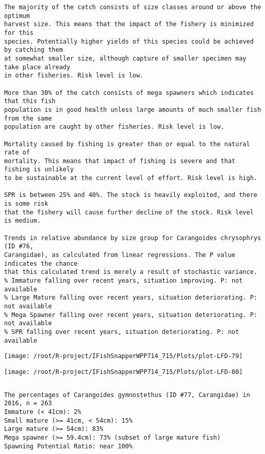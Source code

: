 \documentclass{report}\usepackage[]{graphicx}\usepackage[]{color}
\makeatletter
\def\maxwidth{ %
  \ifdim\Gin@nat@width>\linewidth
    \linewidth
  \else
    \Gin@nat@width
  \fi
}
\newenvironment{kframe}{%
 \def\at@end@of@kframe{}%
 \ifinner\ifhmode%
  \def\at@end@of@kframe{\end{minipage}}%
  \begin{minipage}{\columnwidth}%
 \fi\fi%
 \def\FrameCommand##1{\hskip\@totalleftmargin \hskip-\fboxsep
 \colorbox{shadecolor}{##1}\hskip-\fboxsep
     \hskip-\linewidth \hskip-\@totalleftmargin \hskip\columnwidth}%
 \MakeFramed {\advance\hsize-\width
   \@totalleftmargin\z@ \linewidth\hsize
   \@setminipage}}%
 {\par\unskip\endMakeFramed%
 \at@end@of@kframe}
\newenvironment{knitrout}{}{} %
\makeatother
\begin{document}
\begin{knitrout}
\begin{kframe}
\begin{verbatim}
The majority of the catch consists of size classes around or above the optimum
harvest size. This means that the impact of the fishery is minimized for this
species. Potentially higher yields of this species could be achieved by catching them
at somewhat smaller size, although capture of smaller specimen may take place already
in other fisheries. Risk level is low.

More than 30% of the catch consists of mega spawners which indicates that this fish
population is in good health unless large amounts of much smaller fish from the same
population are caught by other fisheries. Risk level is low.
 
Mortality caused by fishing is greater than or equal to the natural rate of
mortality. This means that impact of fishing is severe and that fishing is unlikely
to be sustainable at the current level of effort. Risk level is high.
 
SPR is between 25% and 40%. The stock is heavily exploited, and there is some risk
that the fishery will cause further decline of the stock. Risk level is medium.
 
Trends in relative abundance by size group for Carangoides chrysophrys (ID #76,
Carangidae), as calculated from linear regressions. The P value indicates the chance
that this calculated trend is merely a result of stochastic variance.
% Immature falling over recent years, situation improving. P: not available
% Large Mature falling over recent years, situation deteriorating. P: not available
% Mega Spawner falling over recent years, situation deteriorating. P: not available
% SPR falling over recent years, situation deteriorating. P: not available
\end{verbatim}
\end{kframe}
\texttt{[image: /root/R-project/IFishSnapperWPP714\_715/Plots/plot-LFD-79]} 

\texttt{[image: /root/R-project/IFishSnapperWPP714\_715/Plots/plot-LFD-80]} 
\begin{kframe}\begin{verbatim}
\end{verbatim}
\end{kframe}
\clearpage
\newpage
\begin{kframe}\begin{verbatim}The percentages of Carangoides gymnostethus (ID #77, Carangidae) in 2016, n = 263
Immature (< 41cm): 2%
Small mature (>= 41cm, < 54cm): 15%
Large mature (>= 54cm): 83%
Mega spawner (>= 59.4cm): 73% (subset of large mature fish)
Spawning Potential Ratio: near 100%
 

\end{verbatim}
\end{kframe}
\end{knitrout}
\end{document}
